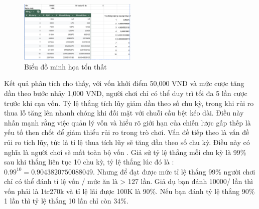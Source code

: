 \documentclass[a4paper,12pt]{article}
\begin{document}
\begin{table}[h!]
    \centering
    \caption{Kết quả kiểm thử với vốn ban đầu 50,000 VND và bước nhảy 1,000 VND}
\end{table}
\begin{figure}[h]
    \centering
    \includegraphics[width=0.5\textwidth]{losss.png}
    \caption{Biểu đồ minh họa tổn thất}
\end{figure}
Kết quả phân tích cho thấy, với vốn khởi điểm 50,000 VND và mức cược tăng dần theo bước nhảy 1,000 VND, người chơi chỉ có thể duy trì tối đa 5 lần cược trước khi cạn vốn. Tỷ lệ thắng tích lũy giảm dần theo số chu kỳ, trong khi rủi ro thua lỗ tăng lên nhanh chóng khi đối mặt với chuỗi cầu bệt kéo dài. Điều này nhấn mạnh rằng việc quản lý vốn và hiểu rõ giới hạn của chiến lược gấp thếp là yếu tố then chốt để giảm thiểu rủi ro trong trò chơi.
Vấn đề tiếp theo là vấn đề rủi ro tích lũy, tức là tỉ lệ thua tích lũy sẽ tăng dần theo số chu kỳ. Điều này có nghĩa là người chơi sẽ mất toàn bộ vốn . Giả sử tỷ lệ thắng mỗi chu kỳ là 99\% sau khi thắng liên tục 10 chu kỳ, tỷ lệ thắng lúc đó là : $0.99^{10} = 0.9043820750088049$.  Nhưng để đạt được mức tỉ lệ thắng 99\% người chơi chỉ có thể đánh tỉ lệ vốn / mức ăn là > 127 lần. Giả dụ bạn đánh 10000/ lần thì vốn phải là 1tr270k và tỉ lệ lãi được 100K là  90\%.
Nếu bạn đánh tỷ lệ thắng 90\% 1 lần thì tỷ lệ thắng 10 lần chỉ còn 34\%. 
\end{document}
